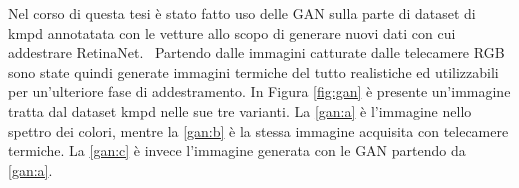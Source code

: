 Nel corso di questa tesi è stato fatto uso delle \ac{GAN} sulla parte di dataset di \ac{kmpd} annotatata con le vetture allo scopo di generare nuovi dati con cui addestrare RetinaNet. 
Partendo dalle immagini catturate dalle telecamere RGB sono state quindi generate immagini termiche del tutto realistiche ed utilizzabili per un'ulteriore fase di addestramento. In Figura \ref{fig:gan} è presente un'immagine tratta dal dataset \ac{kmpd} nelle sue tre varianti. La \ref{gan:a} è l'immagine nello spettro dei colori, mentre la \ref{gan:b} è la stessa immagine acquisita con telecamere termiche. La \ref{gan:c} è invece l'immagine generata con le \ac{GAN} partendo da \ref{gan:a}.
\begin{figure}[]
    \begin{minipage}{.29\linewidth}
        \centering
    \end{minipage}%
    \begin{minipage}{.29\linewidth}
        \centering
\end{minipage}
\end{figure}

